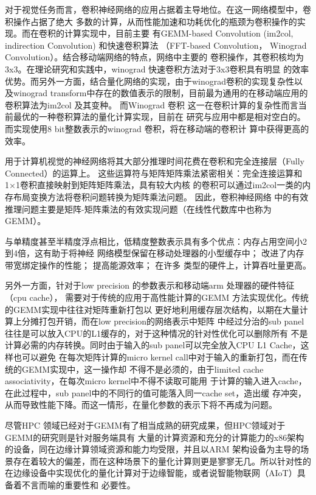 对于视觉任务而言，卷积神经网络的应用占据着主导地位。在这一网络模型中，卷积操作占据了绝大
多数的计算，从而性能加速和功耗优化的瓶颈为卷积操作的实现。而在卷积的计算实现中，目前主要
有GEMM-based Convolution (im2col, indirection Convolution) 和快速卷积算法
（FFT-based Convolution， Winograd Convolution）。结合移动端网络的特点，网络中主要的
卷积操作，其卷积核均为3x3。在理论研究和实践中，winograd 快速卷积方法对于3x3卷积具有明显
的效率优势。而另外一方面，结合量化网络的实现，由于winograd卷积的实现复杂性以及winograd 
transform中存在的数值表示的限制，目前最为通用的在移动端应用的卷积算法为im2col 及其变种。
而Winograd 卷积 这一在卷积计算的复杂性而言当前最优的一种卷积算法的量化计算实现，目前在
研究与应用中都是相对空白的。而实现使用8 bit整数表示的winograd 卷积，将在移动端的卷积计
算中获得更高的效率。

用于计算机视觉的神经网络将其大部分推理时间花费在卷积和完全连接层（Fully Connected）的运算上。
这些运算符与矩阵矩阵乘法紧密相关：完全连接运算和1×1卷积直接映射到矩阵矩阵乘法，具有较大内核
的卷积可以通过im2col一类的内存布局变换方法将卷积问题转换为矩阵乘法问题。 因此，卷积神经网络
中的有效推理问题主要是矩阵-矩阵乘法的有效实现问题（在线性代数库中也称为GEMM）。

与单精度甚至半精度浮点相比，低精度整数表示具有多个优点：内存占用空间小2到4倍，这有助于将神经
网络模型保留在移动处理器的小型缓存中； 改进了内存带宽绑定操作的性能； 提高能源效率； 在许多
类型的硬件上，计算吞吐量更高。

另外一方面，针对于low precision 的参数表示和移动端arm 处理器的硬件特征（cpu cache），
需要对于传统的应用于高性能计算的GEMM 方法实现优化。传统的GEMM实现中往往对矩阵重新打包以
更好地利用缓存层次结构，以期在大量计算上分摊打包开销，而在low precision的网络表示中矩阵
中经过分治的sub panel往往是可以放入CPU的L1缓存的，对于这种情况的针对性优化可以删除所有
不是计算必需的内存转换。同时由于输入的sub panel可以完全放入CPU L1 Cache，这样也可以避免
在每次矩阵计算的micro kernel call中对于输入的重新打包，而在传统的GEMM实现中，这一操作却
不得不是必须的，由于limited cache associativity，在每次micro kernel中不得不读取可能用
于计算的输入进入cache，在此过程中，sub panel中的不同行的值可能落入同一cache set，造出缓
存冲突，从而导致性能下降。而这一情形，在量化参数的表示下将不再成为问题。

尽管HPC 领域已经对于GEMM有了相当成熟的研究成果，但HPC领域对于GEMM的研究则是针对服务端具有
大量的计算资源和充分的计算能力的x86架构的设备，同在边缘计算领域资源和能力均受限，并且以ARM
架构设备为主导的场景存在着较大的偏差，而在这种场景下的量化计算则更是寥寥无几。所以针对性的
在边缘设备中实现优化的量化计算对于边缘智能，或者说智能物联网（AIoT）具备着不言而喻的重要性和
必要性。

